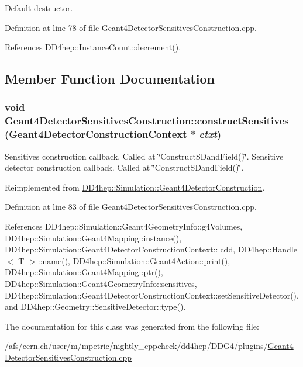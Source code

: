 Default destructor. 

Definition at line 78 of file Geant4DetectorSensitivesConstruction.cpp.

References DD4hep::InstanceCount::decrement().

\subsection{Member Function Documentation}
\hypertarget{class_d_d4hep_1_1_simulation_1_1_geant4_detector_sensitives_construction_ae698013abe689d2e76e1423d5e08f246}{
\subsubsection[{constructSensitives}]{\setlength{\rightskip}{0pt plus 5cm}void Geant4DetectorSensitivesConstruction::constructSensitives ({\bf Geant4DetectorConstructionContext} $\ast$ {\em ctxt})}}
\label{class_d_d4hep_1_1_simulation_1_1_geant4_detector_sensitives_construction_ae698013abe689d2e76e1423d5e08f246}


Sensitives construction callback. Called at \char`\"{}ConstructSDandField()\char`\"{}. Sensitive detector construction callback. Called at \char`\"{}ConstructSDandField()\char`\"{}. 

Reimplemented from \hyperlink{class_d_d4hep_1_1_simulation_1_1_geant4_detector_construction_a852a3cd581f106a1f8c65122fb517dab}{DD4hep::Simulation::Geant4DetectorConstruction}.

Definition at line 83 of file Geant4DetectorSensitivesConstruction.cpp.

References DD4hep::Simulation::Geant4GeometryInfo::g4Volumes, DD4hep::Simulation::Geant4Mapping::instance(), DD4hep::Simulation::Geant4DetectorConstructionContext::lcdd, DD4hep::Handle$<$ T $>$::name(), DD4hep::Simulation::Geant4Action::print(), DD4hep::Simulation::Geant4Mapping::ptr(), DD4hep::Simulation::Geant4GeometryInfo::sensitives, DD4hep::Simulation::Geant4DetectorConstructionContext::setSensitiveDetector(), and DD4hep::Geometry::SensitiveDetector::type().

The documentation for this class was generated from the following file:\begin{DoxyCompactItemize}
\item 
/afs/cern.ch/user/m/mpetric/nightly\_\-cppcheck/dd4hep/DDG4/plugins/\hyperlink{_geant4_detector_sensitives_construction_8cpp}{Geant4DetectorSensitivesConstruction.cpp}\end{DoxyCompactItemize}
